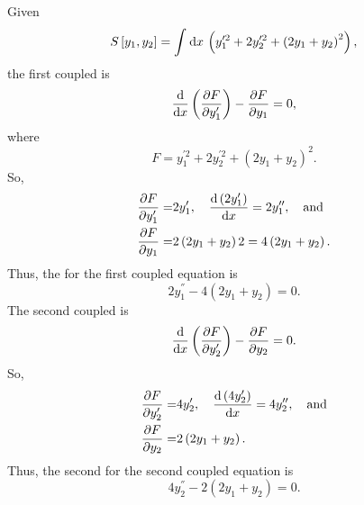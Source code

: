 \def\F{ y_1^{\prime2}  + 2y_2^{\prime2}+\left(2y_1+y_2\right)^2}%
Given
\[
	S\left[y_1,y_2\right] = \Int{}{}{x}\left( \F \right),
\]
the first coupled \el is
\[
	\ELE{F}{x}{y_{1}},
\]
where
\[
	F = \F.
\]
So,
\begin{align*}
	\pderiv{F}{y_1^\prime} =& 2y_1^\prime,\quad \deriv{\left(2y_1^\prime\right)}{x} = 2y_1^\dprime,\quad\textrm{and}\\
	\pderiv{F}{y_1}=&2\left(2y_1+y_2\right)2 = 4\left(2y_1+y_2\right).
\end{align*}
Thus, the \el for the first coupled equation is
\begin{equation}
	2y_1^\dprime - 4\left(2y_1+y_2\right) = 0.
\end{equation}
The second coupled \el is
\[
	\ELE{F}{x}{y_{2}}.
\]
So,
\begin{align*}
	\pderiv{F}{y_2^\prime} =& 4y_2^\prime,\quad \deriv{\left(4y_2^\prime\right)}{x} = 4y_2^\dprime,\quad\textrm{and}\\
	\pderiv{F}{y_2}=&2\left(2y_1+y_2\right).
\end{align*}
Thus, the second \el for the second coupled equation is 
\begin{equation}
	4y_2^\dprime - 2\left(2y_1+y_2\right) = 0.
\end{equation}